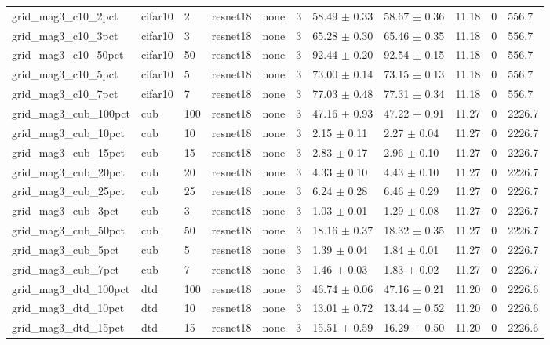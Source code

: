 \begin{tabular}{lllllllllll}
grid_mag3_c10_2pct & cifar10 & 2 & resnet18 & none & 3 & 58.49 $\pm$ 0.33 & 58.67 $\pm$ 0.36 & 11.18 & 0 & 556.7 \\
grid_mag3_c10_3pct & cifar10 & 3 & resnet18 & none & 3 & 65.28 $\pm$ 0.30 & 65.46 $\pm$ 0.35 & 11.18 & 0 & 556.7 \\
grid_mag3_c10_50pct & cifar10 & 50 & resnet18 & none & 3 & 92.44 $\pm$ 0.20 & 92.54 $\pm$ 0.15 & 11.18 & 0 & 556.7 \\
grid_mag3_c10_5pct & cifar10 & 5 & resnet18 & none & 3 & 73.00 $\pm$ 0.14 & 73.15 $\pm$ 0.13 & 11.18 & 0 & 556.7 \\
grid_mag3_c10_7pct & cifar10 & 7 & resnet18 & none & 3 & 77.03 $\pm$ 0.48 & 77.31 $\pm$ 0.34 & 11.18 & 0 & 556.7 \\
grid_mag3_cub_100pct & cub & 100 & resnet18 & none & 3 & 47.16 $\pm$ 0.93 & 47.22 $\pm$ 0.91 & 11.27 & 0 & 2226.7 \\
grid_mag3_cub_10pct & cub & 10 & resnet18 & none & 3 & 2.15 $\pm$ 0.11 & 2.27 $\pm$ 0.04 & 11.27 & 0 & 2226.7 \\
grid_mag3_cub_15pct & cub & 15 & resnet18 & none & 3 & 2.83 $\pm$ 0.17 & 2.96 $\pm$ 0.10 & 11.27 & 0 & 2226.7 \\
grid_mag3_cub_20pct & cub & 20 & resnet18 & none & 3 & 4.33 $\pm$ 0.10 & 4.43 $\pm$ 0.10 & 11.27 & 0 & 2226.7 \\
grid_mag3_cub_25pct & cub & 25 & resnet18 & none & 3 & 6.24 $\pm$ 0.28 & 6.46 $\pm$ 0.29 & 11.27 & 0 & 2226.7 \\
grid_mag3_cub_3pct & cub & 3 & resnet18 & none & 3 & 1.03 $\pm$ 0.01 & 1.29 $\pm$ 0.08 & 11.27 & 0 & 2226.7 \\
grid_mag3_cub_50pct & cub & 50 & resnet18 & none & 3 & 18.16 $\pm$ 0.37 & 18.32 $\pm$ 0.35 & 11.27 & 0 & 2226.7 \\
grid_mag3_cub_5pct & cub & 5 & resnet18 & none & 3 & 1.39 $\pm$ 0.04 & 1.84 $\pm$ 0.01 & 11.27 & 0 & 2226.7 \\
grid_mag3_cub_7pct & cub & 7 & resnet18 & none & 3 & 1.46 $\pm$ 0.03 & 1.83 $\pm$ 0.02 & 11.27 & 0 & 2226.7 \\
grid_mag3_dtd_100pct & dtd & 100 & resnet18 & none & 3 & 46.74 $\pm$ 0.06 & 47.16 $\pm$ 0.21 & 11.20 & 0 & 2226.6 \\
grid_mag3_dtd_10pct & dtd & 10 & resnet18 & none & 3 & 13.01 $\pm$ 0.72 & 13.44 $\pm$ 0.52 & 11.20 & 0 & 2226.6 \\
grid_mag3_dtd_15pct & dtd & 15 & resnet18 & none & 3 & 15.51 $\pm$ 0.59 & 16.29 $\pm$ 0.50 & 11.20 & 0 & 2226.6 \\

\end{tabular}
